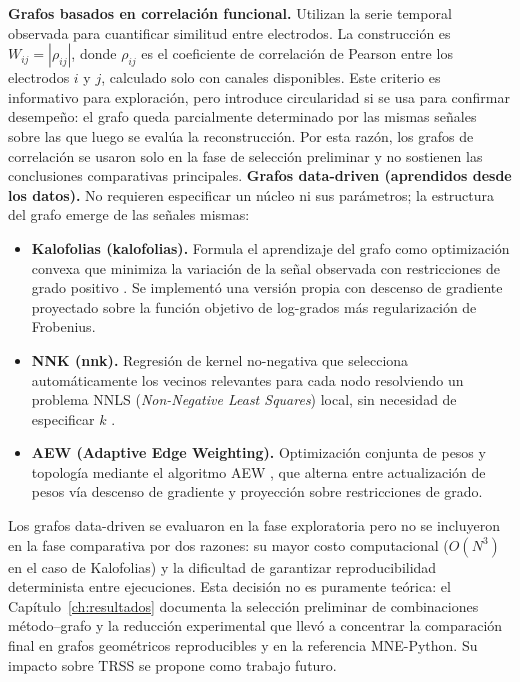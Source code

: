 \textbf{Grafos basados en correlación funcional.} Utilizan la serie temporal observada para cuantificar similitud entre electrodos. La construcción es $W_{ij} = |\rho_{ij}|$, donde $\rho_{ij}$ es el coeficiente de correlación de Pearson entre los electrodos $i$ y $j$, calculado solo con canales disponibles. Este criterio es informativo para exploración, pero introduce circularidad si se usa para confirmar desempeño: el grafo queda parcialmente determinado por las mismas señales sobre las que luego se evalúa la reconstrucción. Por esta razón, los grafos de correlación se usaron solo en la fase de selección preliminar y no sostienen las conclusiones comparativas principales.
\textbf{Grafos data-driven (aprendidos desde los datos).} No requieren especificar un núcleo ni sus parámetros; la estructura del grafo emerge de las señales mismas:

\begin{itemize}[leftmargin=*,itemsep=1pt,topsep=2pt]
\item \textbf{Kalofolias (kalofolias).} Formula el aprendizaje del grafo como optimización convexa que minimiza la variación de la señal observada con restricciones de grado positivo \cite{kalofolias_how_2016}. Se implementó una versión propia con descenso de gradiente proyectado sobre la función objetivo de log-grados más regularización de Frobenius.
\item \textbf{NNK (nnk).} Regresión de kernel no-negativa que selecciona automáticamente los vecinos relevantes para cada nodo resolviendo un problema NNLS (\textit{Non-Negative Least Squares}) local, sin necesidad de especificar $k$ \cite{shekkizhar2020}.
\item \textbf{AEW (Adaptive Edge Weighting).} Optimización conjunta de pesos y topología mediante el algoritmo AEW \cite{shekkizhar2020}, que alterna entre actualización de pesos vía descenso de gradiente y proyección sobre restricciones de grado.
\end{itemize}
Los grafos data-driven se evaluaron en la fase exploratoria pero no se incluyeron en la fase comparativa por dos razones: su mayor costo computacional ($O(N^3)$ en el caso de Kalofolias) y la dificultad de garantizar reproducibilidad determinista entre ejecuciones. Esta decisión no es puramente teórica: el Capítulo~\ref{ch:resultados} documenta la selección preliminar de combinaciones método--grafo y la reducción experimental que llevó a concentrar la comparación final en grafos geométricos reproducibles y en la referencia MNE-Python. Su impacto sobre TRSS se propone como trabajo futuro.

